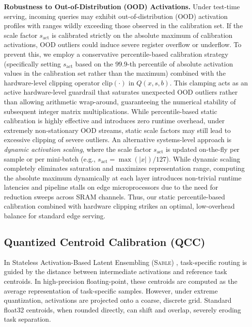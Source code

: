 \textbf{Robustness to Out-of-Distribution (OOD) Activations.} Under test-time serving, incoming queries may exhibit out-of-distribution (OOD) activation profiles with ranges wildly exceeding those observed in the calibration set. If the scale factor $s_{\text{act}}$ is calibrated strictly on the absolute maximum of calibration activations, OOD outliers could induce severe register overflow or underflow. To prevent this, we employ a conservative percentile-based calibration strategy (specifically setting $s_{\text{act}}$ based on the $99.9$-th percentile of absolute activation values in the calibration set rather than the maximum) combined with the hardware-level clipping operator $\text{clip}(\cdot)$ in $Q(x, s, b)$. This clamping acts as an active hardware-level guardrail that saturates unexpected OOD outliers rather than allowing arithmetic wrap-around, guaranteeing the numerical stability of subsequent integer matrix multiplications. While percentile-based static calibration is highly effective and introduces zero runtime overhead, under extremely non-stationary OOD streams, static scale factors may still lead to excessive clipping of severe outliers. An alternative systems-level approach is \emph{dynamic activation scaling}, where the scale factor $s_{\text{act}}$ is updated on-the-fly per sample or per mini-batch (e.g., $s_{\text{act}} = \max(|x|) / 127$). While dynamic scaling completely eliminates saturation and maximizes representation range, computing the absolute maximum dynamically at each layer introduces non-trivial runtime latencies and pipeline stalls on edge microprocessors due to the need for reduction sweeps across SRAM channels. Thus, our static percentile-based calibration combined with hardware clipping strikes an optimal, low-overhead balance for standard edge serving.

\subsection{Quantized Centroid Calibration (QCC)}
In Stateless Activation-Based Latent Ensembling (\textsc{Sable}) \cite{sable2024stateless}, task-specific routing is guided by the distance between intermediate activations and reference task centroids. In high-precision floating-point, these centroids are computed as the average representation of task-specific samples. However, under extreme quantization, activations are projected onto a coarse, discrete grid. Standard float32 centroids, when rounded directly, can shift and overlap, severely eroding task separation.

